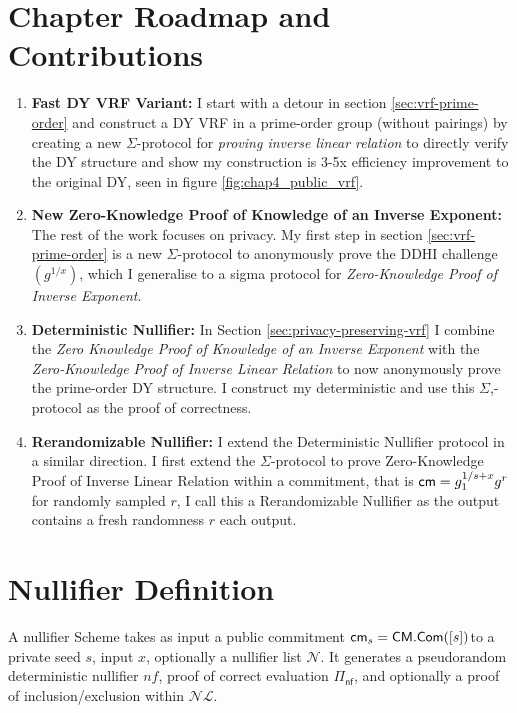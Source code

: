 \section{Chapter Roadmap and Contributions}

\begin{enumerate}
    \item \textbf{Fast DY VRF Variant:} I start with a detour in section \ref{sec:vrf-prime-order} and construct a DY VRF in a prime-order group (without pairings) by creating a new $\Sigma$-protocol for \emph{proving inverse linear relation} to directly verify the DY structure and show my construction is 3-5x efficiency improvement to the original DY, seen in figure \ref{fig:chap4_public_vrf}.

    \item \textbf{New Zero-Knowledge Proof of Knowledge of an Inverse Exponent:} The rest of the work focuses on privacy.  My first step in section \ref{sec:vrf-prime-order} is a new $\Sigma$-protocol to anonymously prove the DDHI challenge $(g^{1/x})$, which I generalise to a sigma protocol for \emph{Zero-Knowledge Proof of Inverse Exponent}.

    \item \textbf{Deterministic Nullifier:} In Section \ref{sec:privacy-preserving-vrf} I combine the \emph{Zero Knowledge Proof of Knowledge of an Inverse Exponent} with the \emph{Zero-Knowledge Proof of Inverse Linear Relation} to now anonymously prove the prime-order DY structure. I construct my deterministic and use this $\Sigma$,-protocol as the proof of correctness. 

    \item \textbf{Rerandomizable Nullifier:} I extend the Deterministic Nullifier protocol in a similar direction. I first extend the $\Sigma$-protocol to prove Zero-Knowledge Proof of Inverse Linear Relation within a commitment, that is $\mathsf{cm}=g_1^{1/s+x}g^r$ for randomly sampled $r$, I call this a Rerandomizable Nullifier as the output contains a fresh randomness $r$ each output.
\end{enumerate}


\section{Nullifier Definition}


A nullifier Scheme takes as input a public commitment $\mathsf{cm}_s = \mathsf{CM.Com}([s])$to a private seed $s$, input $x$, optionally a nullifier list $\mathcal{N}$. It generates a pseudorandom deterministic nullifier $nf$, proof of correct evaluation $\Pi_{\mathsf{nf}}$, and optionally a proof of inclusion/exclusion within $\mathcal{NL}$.

